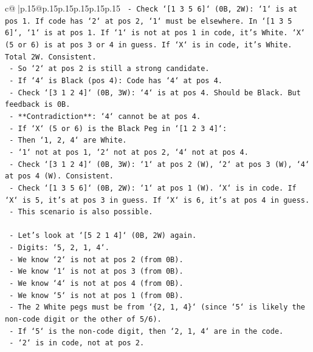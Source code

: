 \documentclass{article}
\begin{document}
{\begin{supertabular}{c@{$\;$}|p{.15\linewidth}@{}p{.15\linewidth}p{.15\linewidth}p{.15\linewidth}p{.15\linewidth}p{.15\linewidth}}
{{{\texttt{            {-} Check `{[}1 3 5 6{]}` (0B, 2W): `1` is at pos 1. If code has `2` at pos 2, `1` must be elsewhere. In `{[}1 3 5 6{]}`, `1` is at pos 1. If `1` is not at pos 1 in code, it's White. `X` (5 or 6) is at pos 3 or 4 in guess. If `X` is in code, it's White. Total 2W. Consistent.} \\
\texttt{            {-} So `2` at pos 2 is still a strong candidate.} \\
\texttt{        {-} If `4` is Black (pos 4): Code has `4` at pos 4.} \\
\texttt{            {-} Check `{[}3 1 2 4{]}` (0B, 3W): `4` is at pos 4. Should be Black. But feedback is 0B.} \\
\texttt{            {-} **Contradiction**: `4` cannot be at pos 4.} \\
\texttt{        {-} If `X` (5 or 6) is the Black Peg in `{[}1 2 3 4{]}`:} \\
\texttt{            {-} Then `1, 2, 4` are White.} \\
\texttt{            {-} `1` not at pos 1, `2` not at pos 2, `4` not at pos 4.} \\
\texttt{            {-} Check `{[}3 1 2 4{]}` (0B, 3W): `1` at pos 2 (W), `2` at pos 3 (W), `4` at pos 4 (W). Consistent.} \\
\texttt{            {-} Check `{[}1 3 5 6{]}` (0B, 2W): `1` at pos 1 (W). `X` is in code. If `X` is 5, it's at pos 3 in guess. If `X` is 6, it's at pos 4 in guess.} \\
\texttt{            {-} This scenario is also possible.} \\
\\ 
\texttt{    {-} Let's look at `{[}5 2 1 4{]}` (0B, 2W) again.} \\
\texttt{        {-} Digits: `5, 2, 1, 4`.} \\
\texttt{        {-} We know `2` is not at pos 2 (from 0B).} \\
\texttt{        {-} We know `1` is not at pos 3 (from 0B).} \\
\texttt{        {-} We know `4` is not at pos 4 (from 0B).} \\
\texttt{        {-} We know `5` is not at pos 1 (from 0B).} \\
\texttt{        {-} The 2 White pegs must be from `\{2, 1, 4\}` (since `5` is likely the non{-}code digit or the other of 5/6).} \\
\texttt{        {-} If `5` is the non{-}code digit, then `2, 1, 4` are in the code.} \\
\texttt{            {-} `2` is in code, not at pos 2.} \\
}}}
\end{supertabular}}
\end{document}
